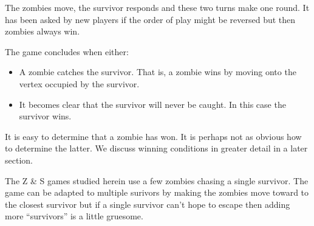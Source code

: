 The zombies move, the survivor responds and these two turns make one round.
It has been asked by new players if the order of play might be reversed but
then zombies always win.

The game concludes when either:
\begin{itemize}
\item A zombie catches the survivor. That is, a zombie wins by moving onto the vertex
occupied by the survivor.
\item It becomes clear that the survivor will never be caught.
In this case the survivor wins.
\end{itemize}

It is easy to determine that a zombie has won. It is perhaps not as obvious how
to determine the latter. We discuss winning conditions in greater detail in a later section.

The Z \& S games studied herein use a few zombies chasing a single survivor. The game
can be adapted to multiple surivors by making the zombies move toward
to the closest survivor but if a single survivor can't hope to escape then adding more ``survivors''
is a little gruesome.
